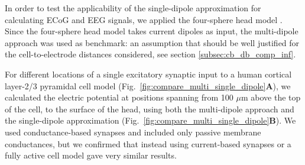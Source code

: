 \documentclass[preprint,10pt,authoryear]{elsarticle}
\newcommand{\hlg}[2][Emerald]{ {\sethlcolor{#1} \hl{#2}} }
\newcommand{\tvnnote}[1]{\color{white}{\hlg{TVN: #1 }}\color{black}}
\begin{document}

In order to test the applicability of the single-dipole approximation for calculating ECoG and EEG signals, we applied the four-sphere head model \citep{NAESS2017, HAGEN2018, HAGEN2019}.
Since the four-sphere head model takes current dipoles as input, the multi-dipole approach was used as benchmark: an assumption that should be well justified for the cell-to-electrode distances considered, see section \ref{subsec:cb_db_comp_inf}.


For different locations of a single excitatory synaptic input to a human cortical layer-2/3 pyramidal cell model \citep{EYAL2016}
(Fig.~\ref{fig:compare_multi_single_dipole}\textbf{A}), we calculated the electric potential at positions spanning from 100 $\mu$m above the top of the cell, to the surface of the head, using both the multi-dipole approach and the single-dipole approximation (Fig.~\ref{fig:compare_multi_single_dipole}\textbf{B}).
We used conductance-based synapses and included only passive membrane conductances, but we confirmed that instead using current-based synapses or a fully active cell model gave very similar results.  
\end{document}
